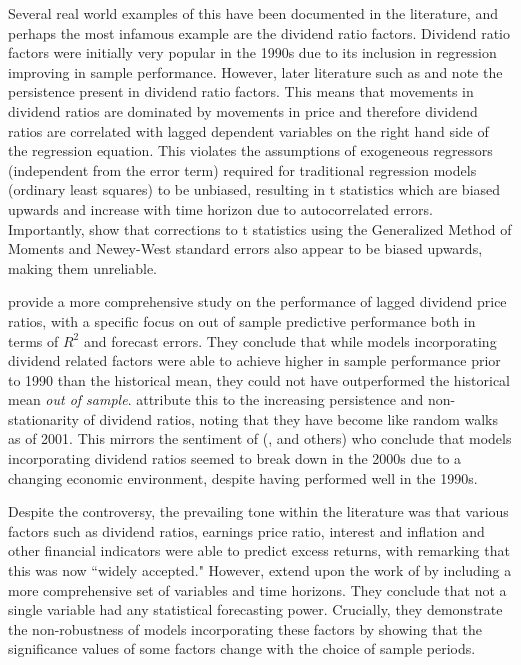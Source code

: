 \documentclass[11pt, a4paper, table]{article}
\begin{document}
Several real world examples of this have been documented in the literature, and perhaps the most infamous example are the dividend ratio factors. Dividend ratio factors were initially very popular in the 1990s due to its inclusion in regression improving in sample performance. However, later literature such as  \cite{goetzmann_testing_1993} and \cite{ang_stock_2006} note the persistence present in dividend ratio factors. This means that movements in dividend ratios are dominated by movements in price and therefore dividend ratios are correlated with lagged dependent variables on the right hand side of the regression equation. This violates the assumptions of exogeneous regressors (independent from the error term) required for traditional regression models (ordinary least squares) to be unbiased, resulting in t statistics which are biased upwards and increase with time horizon due to autocorrelated errors. Importantly, \cite{goetzmann_testing_1993} show that corrections to t statistics using the Generalized Method of Moments and Newey-West standard errors also appear to be biased upwards, making them unreliable. 

\cite{goyal_predicting_2003} provide a more comprehensive study on the performance of lagged dividend price ratios, with a specific focus on out of sample predictive performance both in terms of $R^2$ and forecast errors. They conclude that while models incorporating dividend related factors were able to achieve higher in sample performance prior to 1990 than the historical mean, they could not have outperformed the historical mean \textit{out of sample}. \cite{goyal_predicting_2003} attribute this to the increasing persistence and non-stationarity of dividend ratios, noting that they have become like random walks as of 2001. This mirrors the sentiment of (\cite{lettau_consumption_2001}, \cite{schwert_anomalies_2003} and others) who conclude that models incorporating dividend ratios seemed to break down in the 2000s due to a changing economic environment, despite having performed well in the 1990s.

Despite the controversy, the prevailing tone within the literature was that various factors such as dividend ratios, earnings price ratio, interest and inflation and other financial indicators were able to predict excess returns, with \cite{lettau_consumption_2001} remarking that this was now ``widely accepted." However, \cite{welch_comprehensive_2008} extend upon the work of \cite{goyal_predicting_2003} by including a more comprehensive set of variables and time horizons. They conclude that not a single variable had any statistical forecasting power. Crucially, they demonstrate the non-robustness of models incorporating these factors by showing that the significance values of some factors change with the choice of sample periods.
\end{document}
